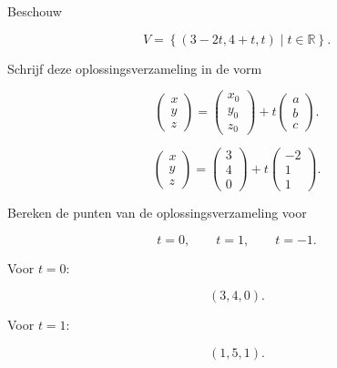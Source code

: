 \documentclass{ximera}
\begin{document}
\begin{oefening}{\oefU\ESS}

Beschouw

\[
V=
\left\{
(3-2t,4+t,t)
\mid t\in\mathbb{R}
\right\}.
\]

\begin{question}

Schrijf deze oplossingsverzameling in de vorm

\[
\begin{pmatrix}
x\\y\\z
\end{pmatrix}
=
\begin{pmatrix}
x_0\\y_0\\z_0
\end{pmatrix}
+
t
\begin{pmatrix}
a\\b\\c
\end{pmatrix}.
\]

\begin{oplossing}

\[
\begin{pmatrix}
x\\y\\z
\end{pmatrix}
=
\begin{pmatrix}
3\\4\\0
\end{pmatrix}
+
t
\begin{pmatrix}
-2\\1\\1
\end{pmatrix}.
\]

\end{oplossing}

\end{question}


\begin{question}

Bereken de punten van de oplossingsverzameling voor

\[
t=0,\qquad t=1,\qquad t=-1.
\]

\begin{oplossing}

Voor \(t=0\):

\[
(3,4,0).
\]

Voor \(t=1\):

\[
(1,5,1).
\]


\end{oplossing}
\end{question}
\end{oefening}
\end{document}
